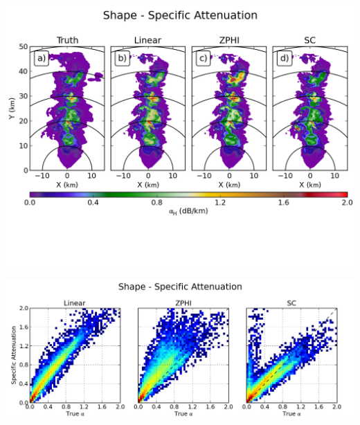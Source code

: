 \documentclass[red]{beamer}
\begin{document}
\begin{frame}
	\begin{center}
		\includegraphics[scale=0.55]{figures/C_Shape_Specific_Attenuation.png}
	\end{center}
\end{frame}

\begin{frame}
	\begin{center}
		\includegraphics[scale=0.45]{figures/C_Shape_Specific_Attenuation_scatter.png}
	\end{center}
\end{frame}
\end{document}
